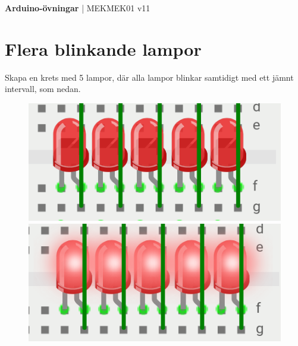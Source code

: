 \documentclass[11pt]{article}
\begin{document}
\begin{center}
      \textbf{\huge{Arduino-övningar}}
      \huge{| MEKMEK01 v11}
\end{center}
\raggedright{}
\begin{center}
\end{center}

\section{Flera blinkande lampor}\label{sec:flera-lampor}
Skapa en krets med 5 lampor, där alla lampor blinkar samtidigt med ett jämnt
intervall, som nedan.
\begin{figure}[H]
      \centering
      \begin{minipage}{0.4\textwidth}
            \includegraphics[width=\textwidth]{5led-low}
      \end{minipage}
      \begin{minipage}{0.4\textwidth}
            \includegraphics[width=\textwidth]{5led-high}
      \end{minipage}
\end{figure}
\end{document}
